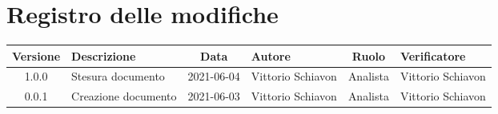 \section*{Registro delle modifiche}

\begin{center}
	\begin{longtable}{|c|p{3.5cm}|c|p{1.8cm}|c|p{1.8cm}|}
	\hline
	\rowcolor{lighter-grayer}
	\textbf{Versione} & \textbf{Descrizione} & \textbf{Data} & \textbf{Autore} & \textbf{Ruolo} & \textbf{Verificatore} \\
	\hline
	\endfirsthead



	1.0.0 & Stesura documento & 2021-06-04 & Vittorio Schiavon & Analista & Vittorio Schiavon\\
\hline
	0.0.1 & Creazione documento & 2021-06-03 & Vittorio Schiavon & Analista & Vittorio Schiavon\\
	\hline

	\end{longtable}
\end{center}